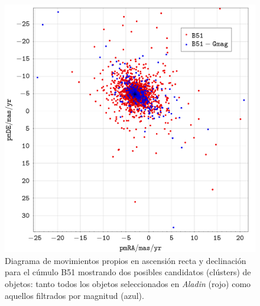 \documentclass[a4paper,fleqn,usenatbib]{mnras}
\begin{document}
\begin{figure}
  \includegraphics[width=\linewidth]{img/b51_pmra_pmde}
  \caption{Diagrama de movimientos propios en ascensión recta y declinación para el cúmulo B51 mostrando dos posibles candidatos (clústers) de objetos: tanto todos los objetos seleccionados en \emph{Aladin} (rojo) como aquellos filtrados por magnitud (azul).}
  \label{fig:e2_b51_pmrapmde}
\end{figure}
\end{document}
